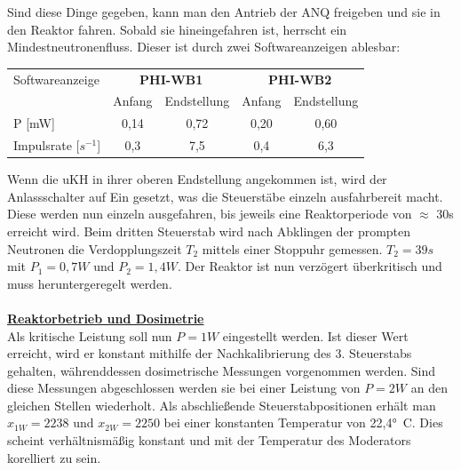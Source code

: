     Sind diese Dinge gegeben, kann man den Antrieb der ANQ freigeben und sie in den Reaktor fahren. Sobald sie hineingefahren ist, herrscht ein Mindestneutronenfluss. Dieser ist durch zwei Softwareanzeigen ablesbar: 
    \begin{center}
    \begin{tabular}{l|c|c|c|c}
             Softwareanzeige  & \multicolumn{2}{c|}{\textbf{PHI-WB1}} & \multicolumn{2}{c}{\textbf{PHI-WB2}}\\
                              & Anfang & Endstellung & Anfang & Endstellung \\ 
       \hline           P [mW]& 0,14   & 0,72        & 0,20   & 0,60        \\
         Impulsrate [$s^{-1}$]& 0,3    & 7,5         & 0,4    & 6,3         
    \end{tabular}
    \label{df:ANQein}
    \end{center}
    Wenn die uKH in ihrer oberen Endstellung angekommen ist, wird der Anlassschalter auf Ein gesetzt, was die Steuerstäbe einzeln ausfahrbereit macht. Diese werden nun einzeln ausgefahren, bis jeweils eine Reaktorperiode von $\approx$ 30\unit{s} erreicht wird.
    Beim dritten Steuerstab wird nach Abklingen der prompten Neutronen die Verdopplungszeit $T_2$ mittels einer Stoppuhr gemessen. $T_2 = 39\unit{s}$ mit $P_1 = 0,7\unit{W}$ und $P_2 = 1,4\unit{W}$. Der Reaktor ist nun verzögert überkritisch und muss heruntergeregelt werden.\\ \ \\
    \underline{\textbf{Reaktorbetrieb und Dosimetrie}}\\
    Als kritische Leistung soll nun $P=1\unit{W}$ eingestellt werden. Ist dieser Wert erreicht, wird er konstant mithilfe der Nachkalibrierung des 3. Steuerstabs gehalten, währenddessen dosimetrische Messungen vorgenommen werden. Sind diese Messungen abgeschlossen werden sie bei einer Leistung von $P = 2\unit{W}$ an den gleichen Stellen wiederholt.
    Als abschließende Steuerstabpositionen erhält man $x_{1\unit{W}} = 2238$ und $x_{2\unit{W}} = 2250$ bei einer konstanten Temperatur von 22,4\unit{°C}. Dies scheint verhältnismäßig konstant und mit der Temperatur des Moderators korelliert zu sein.
